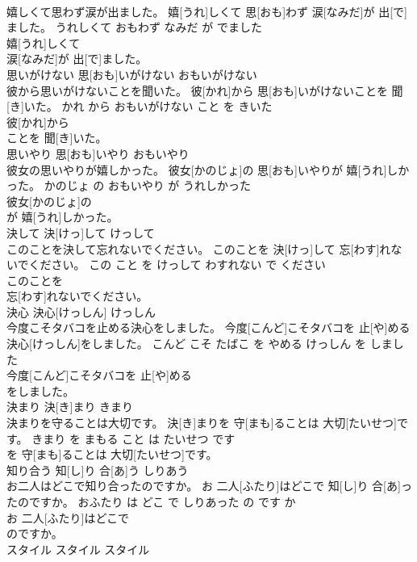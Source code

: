 \documentclass[8pt]{extreport}
\begin{document}
\begin{CJK}{UTF8}{min}
\\	嬉しくて思わず涙が出ました。	嬉[うれ]しくて 思[おも]わず 涙[なみだ]が 出[で]ました。	うれしくて おもわず なみだ が でました	
\\	嬉[うれ]しくて
\\	涙[なみだ]が 出[で]ました。			
\\	思いがけない	思[おも]いがけない	おもいがけない	
\\	彼から思いがけないことを聞いた。	彼[かれ]から 思[おも]いがけないことを 聞[き]いた。	かれ から おもいがけない こと を きいた	
\\	彼[かれ]から
\\	ことを 聞[き]いた。			
\\	思いやり	思[おも]いやり	おもいやり	
\\	彼女の思いやりが嬉しかった。	彼女[かのじょ]の 思[おも]いやりが 嬉[うれ]しかった。	かのじょ の おもいやり が うれしかった	
\\	彼女[かのじょ]の
\\	が 嬉[うれ]しかった。			
\\	決して	決[けっ]して	けっして	
\\	このことを決して忘れないでください。	このことを 決[けっ]して 忘[わす]れないでください。	この こと を けっして わすれない で ください	
\\	このことを
\\	忘[わす]れないでください。			
\\	決心	決心[けっしん]	けっしん	
\\	今度こそタバコを止める決心をしました。	今度[こんど]こそタバコを 止[や]める 決心[けっしん]をしました。	こんど こそ たばこ を やめる けっしん を しました	
\\	今度[こんど]こそタバコを 止[や]める
\\	をしました。			
\\	決まり	決[き]まり	きまり	
\\	決まりを守ることは大切です。	決[き]まりを 守[まも]ることは 大切[たいせつ]です。	きまり を まもる こと は たいせつ です	
\\	を 守[まも]ることは 大切[たいせつ]です。			
\\	知り合う	知[し]り 合[あ]う	しりあう	
\\	お二人はどこで知り合ったのですか。	お 二人[ふたり]はどこで 知[し]り 合[あ]ったのですか。	おふたり は どこ で しりあった の です か	
\\	お 二人[ふたり]はどこで
\\	のですか。			
\\	スタイル	スタイル	スタイル	

\end{CJK}
\end{document}
